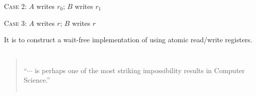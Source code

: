 \begin{frame}{}
  \begin{center}
    \resizebox{0.60\textwidth}{!}{}
  \end{center}

  \centerline{\Large \textsc{Case 2}: $A$ writes $r_0$; \quad $B$ writes $r_1$}
\end{frame}

\begin{frame}{}
  \begin{center}
    \resizebox{0.45\textwidth}{!}{}
  \end{center}

  \centerline{\Large \textsc{Case 3}: $A$ writes $r$; \quad $B$ writes $r$}
\end{frame}

\begin{frame}{}
  \begin{theorem}
    It is  to construct a wait-free implementation of  using atomic read/write registers.
  \end{theorem}

  \pause
  \vspace{0.50cm}
  \begin{columns}
      \begin{quote}
	``$\cdots$ is perhaps one of the most striking impossibility results in Computer Science.''
      \end{quote}
  \end{columns}
\end{frame}

